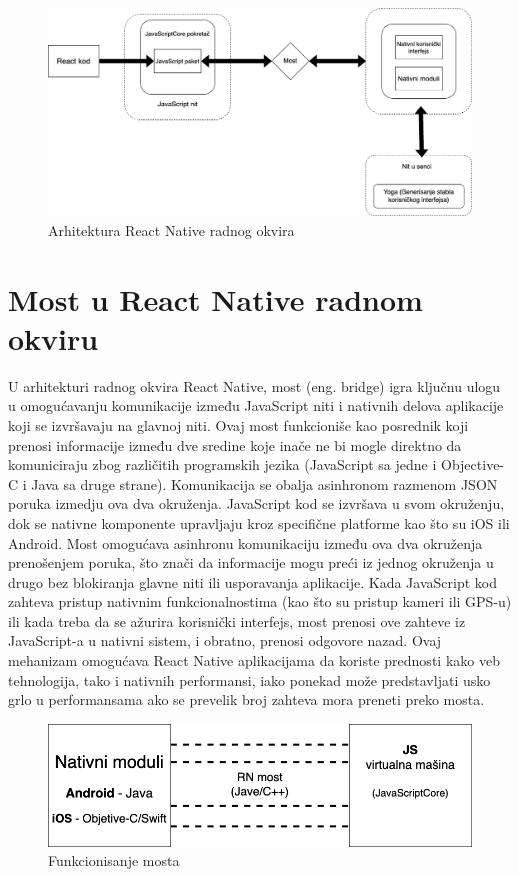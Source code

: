 \documentclass[12pt,oneside]{memoir}
\begin{document}
\begin{figure}[h]
    \centering
    \includegraphics[scale=0.4]{docs/images/chapterThree/reactNativeArchitecture.png}
    \caption{Arhitektura React Native radnog okvira}
    \label{fig:reactNativeArchitecture}
\end{figure}

\section{Most u React Native radnom okviru}

U arhitekturi radnog okvira React Native, most (eng. bridge) igra ključnu ulogu u omogućavanju komunikacije između JavaScript niti i nativnih delova aplikacije koji se izvršavaju na glavnoj niti. Ovaj most funkcioniše kao posrednik koji prenosi informacije između dve sredine koje inače ne bi mogle direktno da komuniciraju zbog različitih programskih jezika (JavaScript sa jedne i Objective-C i Java sa druge strane). Komunikacija se obalja asinhronom razmenom JSON poruka izmedju ova dva okruženja. JavaScript kod se izvršava u svom okruženju, dok se nativne komponente upravljaju kroz specifične platforme kao što su iOS ili Android. Most omogućava asinhronu komunikaciju između ova dva okruženja prenošenjem poruka, što znači da informacije mogu preći iz jednog okruženja u drugo bez blokiranja glavne niti ili usporavanja aplikacije. Kada JavaScript kod zahteva pristup nativnim funkcionalnostima (kao što su pristup kameri ili GPS-u) ili kada treba da se ažurira korisnički interfejs, most prenosi ove zahteve iz JavaScript-a u nativni sistem, i obratno, prenosi odgovore nazad. Ovaj mehanizam omogućava React Native aplikacijama da koriste prednosti kako veb tehnologija, tako i nativnih performansi, iako ponekad može predstavljati usko grlo u performansama ako se prevelik broj zahteva mora preneti preko mosta.

\begin{figure}[h]
    \centering
    \includegraphics[scale=0.5]{docs/images/chapterThree/reactNativeBridge.png}
    \caption{Funkcionisanje mosta}
    \label{fig:reactNativeBridge}
\end{figure}
\end{document}
